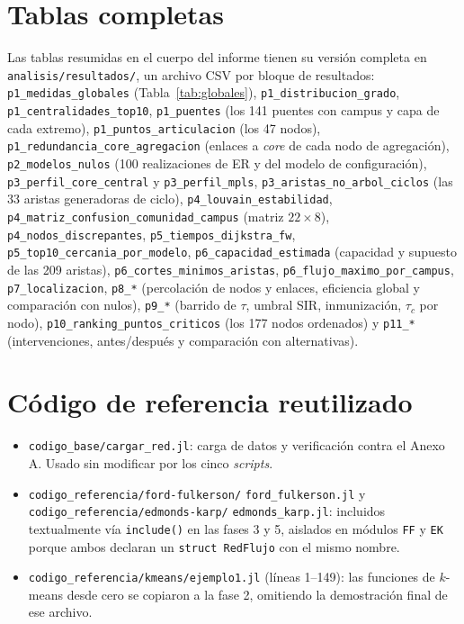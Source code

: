 \documentclass[10pt,a4paper]{extarticle}
\newcommand{\code}[1]{\texttt{\small #1}}
\begin{document}
\section{Tablas completas}

Las tablas resumidas en el cuerpo del informe tienen su versión completa en
\code{analisis/resultados/}, un archivo CSV por bloque de resultados:
\code{p1\_medidas\_globales} (Tabla~\ref{tab:globales}),
\code{p1\_distribucion\_grado},
\code{p1\_centralidades\_top10},
\code{p1\_puentes} (los 141 puentes con campus y capa de cada extremo),
\code{p1\_puntos\_articulacion} (los 47 nodos),
\code{p1\_redundancia\_core\_agregacion} (enlaces a \textit{core} de cada nodo de agregación),
\code{p2\_modelos\_nulos} (100 realizaciones de ER y del modelo de configuración),
\code{p3\_perfil\_core\_central} y \code{p3\_perfil\_mpls},
\code{p3\_aristas\_no\_arbol\_ciclos} (las 33 aristas generadoras de ciclo),
\code{p4\_louvain\_estabilidad},
\code{p4\_matriz\_confusion\_comunidad\_campus} (matriz $22\times 8$),
\code{p4\_nodos\_discrepantes},
\code{p5\_tiempos\_dijkstra\_fw},
\code{p5\_top10\_cercania\_por\_modelo},
\code{p6\_capacidad\_estimada} (capacidad y supuesto de las 209 aristas),
\code{p6\_cortes\_minimos\_aristas},
\code{p6\_flujo\_maximo\_por\_campus},
\code{p7\_localizacion},
\code{p8\_*} (percolación de nodos y enlaces, eficiencia global y comparación con nulos),
\code{p9\_*} (barrido de $\tau$, umbral SIR, inmunización, $\tau_c$ por nodo),
\code{p10\_ranking\_puntos\_criticos} (los 177 nodos ordenados) y \code{p11\_*}
(intervenciones, antes/después y comparación con alternativas).

\section{Código de referencia reutilizado}

\begin{itemize}[leftmargin=*,itemsep=1mm]
\item \code{codigo\_base/cargar\_red.jl}: carga de datos y verificación contra el Anexo A.
Usado sin modificar por los cinco \textit{scripts}.
\item \code{codigo\_referencia/ford-fulkerson/} \code{ford\_fulkerson.jl} y
\code{codigo\_referencia/edmonds-karp/} \code{edmonds\_karp.jl}: incluidos textualmente vía
\code{include()} en las fases 3 y 5, aislados en módulos \code{FF} y \code{EK} porque ambos
declaran un \code{struct RedFlujo} con el mismo nombre.
\item \code{codigo\_referencia/kmeans/ejemplo1.jl} (líneas 1--149): las funciones de
$k$-means desde cero se copiaron a la fase 2, omitiendo la demostración final de ese archivo.
\end{itemize}
\end{document}
